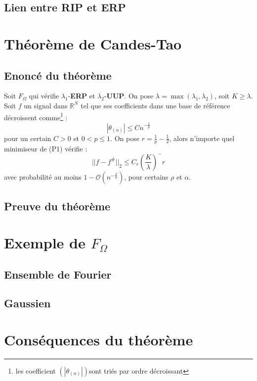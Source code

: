 \subsection{Lien entre \textbf{RIP} et \textbf{ERP}}

\section{Théorème de Candes-Tao}
\subsection{Enoncé du théorème}
\begin{theoreme}
	Soit $F_\Omega$ qui vérifie $\lambda_1$-\textbf{ERP} et $\lambda_2$-\textbf{UUP}.
	On pose $\lambda = \max(\lambda_1, \lambda_2)$, soit $K\geq \lambda$.
	\newline
	Soit $f$ un signal dans $\mathbb{R}^N$ tel que ses coefficients dans une base de référence décroissent comme\footnote{les coefficient $(|\theta_{(n)}|)$sont triés par ordre décroissant} :
	\begin{equation}
		|\theta_{(n)}| \leq C n^{-\frac{1}{p}}
	\end{equation}
	pour un certain $C >0$ et $0 < p \leq 1$. 
	\newline
	On pose $r = \frac{1}{p} - \frac{1}{2}$, alors n'importe quel minimiseur de (P1) vérifie :
	\begin{equation}
		||f - f^\#||_2 \leq C_r (\frac{K}{\lambda})^-r
	\end{equation}
	avec probabilité au moins $1 - \mathcal{O}(n^{-\frac{\rho}{\alpha}})$, pour certains $\rho$ et $\alpha$.
\end{theoreme}
\subsection{Preuve du théorème}

\section{Exemple de $F_\Omega$}
\subsection{Ensemble de Fourier}
\subsection{Gaussien}

\section{Conséquences du théorème}
